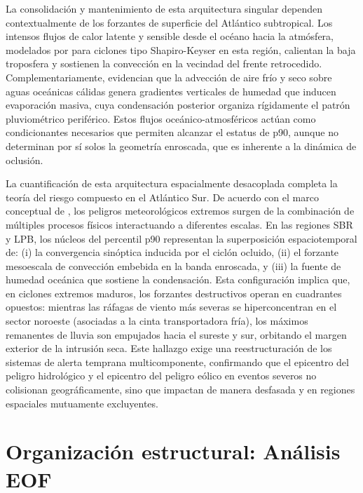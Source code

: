 La consolidación y mantenimiento de esta arquitectura singular dependen contextualmente de los forzantes de superficie del Atlántico subtropical. Los intensos flujos de calor latente y sensible desde el océano hacia la atmósfera, modelados por \citet{gozzo2013air} para ciclones tipo Shapiro-Keyser en esta región, calientan la baja troposfera y sostienen la convección en la vecindad del frente retrocedido. Complementariamente, \citet{andrade2024composite} evidencian que la advección de aire frío y seco sobre aguas oceánicas cálidas genera gradientes verticales de humedad que inducen evaporación masiva, cuya condensación posterior organiza rígidamente el patrón pluviométrico periférico. Estos flujos oceánico-atmosféricos actúan como condicionantes necesarios que permiten alcanzar el estatus de p90, aunque no determinan por sí solos la geometría enroscada, que es inherente a la dinámica de oclusión.

La cuantificación de esta arquitectura espacialmente desacoplada completa la teoría del riesgo compuesto en el Atlántico Sur. De acuerdo con el marco conceptual de \citet{zscheischler2018future}, los peligros meteorológicos extremos surgen de la combinación de múltiples procesos físicos interactuando a diferentes escalas. En las regiones SBR y LPB, los núcleos del percentil p90 representan la superposición espaciotemporal de: (i) la convergencia sinóptica inducida por el ciclón ocluido, (ii) el forzante mesoescala de convección embebida en la banda enroscada, y (iii) la fuente de humedad oceánica que sostiene la condensación. Esta configuración implica que, en ciclones extremos maduros, los forzantes destructivos operan en cuadrantes opuestos: mientras las ráfagas de viento más severas se hiperconcentran en el sector noroeste (asociadas a la cinta transportadora fría), los máximos remanentes de lluvia son empujados hacia el sureste y sur, orbitando el margen exterior de la intrusión seca. Este hallazgo exige una reestructuración de los sistemas de alerta temprana multicomponente, confirmando que el epicentro del peligro hidrológico y el epicentro del peligro eólico en eventos severos no colisionan geográficamente, sino que impactan de manera desfasada y en regiones espaciales mutuamente excluyentes.

\section{Organización estructural: Análisis EOF}\label{sec:eof_tp}
